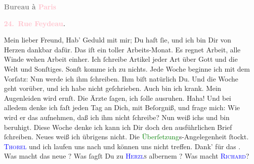            \begin{otherlanguage}{french}\textcolor{gray}{\textbf{\textbf{Bureau à \textcolor{pink}{Paris}{}\ledrightnote{\textcolor{pink}{Paris}}}}}\end{otherlanguage}\pend
           \pstart
           \begin{otherlanguage}{french}\textcolor{gray}{\textbf{\textbf{\textcolor{pink}{24. Rue Feydeau}{}\ledrightnote{\textcolor{pink}{rue Feydeau}}.}}}\end{otherlanguage}\pend
           \pstart\center{}Mein lieber Freund,\pend\pstart
           Hab’ Geduld mit mir; Du haſt ſie, und ich bin Dir von Herzen dankbar dafür. Das iſt
               ein toller Arbeits-Monat. Es regnet Arbeit, alle Winde
               wehen Arbeit einher. Ich ſchreibe Artikel jeder Art über Gott und die Welt und
               Sonſtiges. Sonſt komme ich zu nichts. Jede Woche beginne ich mit dem Vorſatz: Nun
               werde ich ihm ſchreiben. Ihm biſt natürlich Du. Und die Woche geht vorüber, und ich
               habe nicht geſchrieben. {\pb}Auch bin ich krank. Mein
               Augenleiden wird ernſt. Die Ärzte ſagen, ich ſolle ausruhen. Haha! Und bei alledem
               denke ich faſt jeden Tag an Dich, mit Beſorgniß, und frage mich: Wie wird er das
               aufnehmen, daß ich ihm nicht ſchreibe? Nun weiß ichs und bin beruhigt. Diese Woche
               denke ich kann ich Dir doch den ausführlichen Brief ſchreiben. Neues weiß ich
               übrigens nicht. Die \textcolor{green}{Überſetzung}{}s-Angelegenheit ſtockt. \textsc{\textcolor{blue}{Thorel}{}\ledrightnote{\textcolor{blue}{Jean Thorel}}} und ich laufen uns nach und können {\pb}uns nicht
               treffen.\pend
           \pstart
           Dank’ für das \label{K_L02768-1v}\label{K_L02768-1h}. Was macht das neue \label{K_L02768-2v}\label{K_L02768-2h}? Was ſagſt Du zu \textsc{\textcolor{blue}{Herzl}{}\ledrightnote{\textcolor{blue}{Theodor Herzl}}s}{ } albernem \label{K_L02768-5v}\label{K_L02768-5h}? Was macht \textsc{\textcolor{blue}{Richard}{}\ledrightnote{\textcolor{blue}{Richard Beer-Hofmann}}}?\pend
